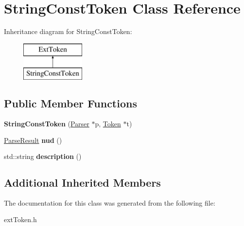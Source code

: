 \hypertarget{class_string_const_token}{}\section{String\+Const\+Token Class Reference}
\label{class_string_const_token}
Inheritance diagram for String\+Const\+Token\+:\begin{figure}[H]
\begin{center}
\leavevmode
\includegraphics[height=2.000000cm]{class_string_const_token}
\end{center}
\end{figure}
\subsection*{Public Member Functions}
\begin{DoxyCompactItemize}
\item 
\hypertarget{class_string_const_token_aba75cdaef187138a572ba49a5c279fcf}{}{\bfseries String\+Const\+Token} (\hyperlink{class_parser}{Parser} $\ast$p, \hyperlink{class_token}{Token} $\ast$t)\label{class_string_const_token_aba75cdaef187138a572ba49a5c279fcf}

\item 
\hypertarget{class_string_const_token_a4767bba84d30289ab31d501f240b80fb}{}\hyperlink{class_parse_result}{Parse\+Result} {\bfseries nud} ()\label{class_string_const_token_a4767bba84d30289ab31d501f240b80fb}

\item 
\hypertarget{class_string_const_token_a6343169471a6cb6e422496f2f640691f}{}std\+::string {\bfseries description} ()\label{class_string_const_token_a6343169471a6cb6e422496f2f640691f}

\end{DoxyCompactItemize}
\subsection*{Additional Inherited Members}


The documentation for this class was generated from the following file\+:\begin{DoxyCompactItemize}
\item 
ext\+Token.\+h\end{DoxyCompactItemize}
